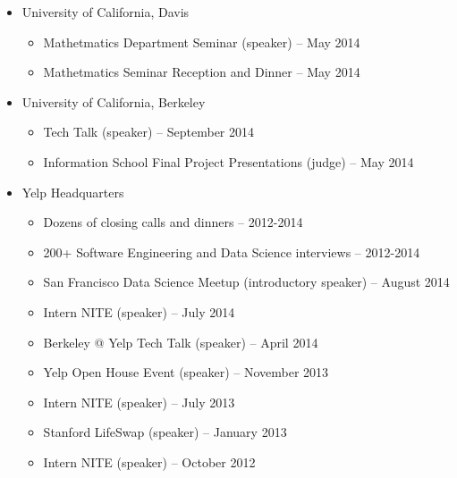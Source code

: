 \documentclass[letterpaper,11pt]{article}
\begin{document}
\begin{itemize}
\begin{itemize}
	\end{itemize}
\item
	University of California, Davis
	\begin{itemize}
		\item Mathetmatics Department Seminar (speaker) -- May 2014
		\item Mathetmatics Seminar Reception and Dinner -- May 2014
	\end{itemize}
\item
	University of California, Berkeley
	\begin{itemize}
		\item Tech Talk (speaker) -- September 2014
		\item Information School Final Project Presentations (judge) -- May 2014
	\end{itemize}
\item
    Yelp Headquarters
    \begin{itemize}
        \item Dozens of closing calls and dinners -- 2012-2014
        \item 200+ Software Engineering and Data Science interviews -- 2012-2014
        \item San Francisco Data Science Meetup (introductory speaker) -- August 2014
        \item Intern NITE (speaker) -- July 2014
        \item Berkeley @ Yelp Tech Talk (speaker) -- April 2014
        \item Yelp Open House Event (speaker) -- November 2013
        \item Intern NITE (speaker) -- July 2013
        \item Stanford LifeSwap (speaker) -- January 2013
        \item Intern NITE (speaker) -- October 2012
    \end{itemize}
\end{itemize}
\end{document}

